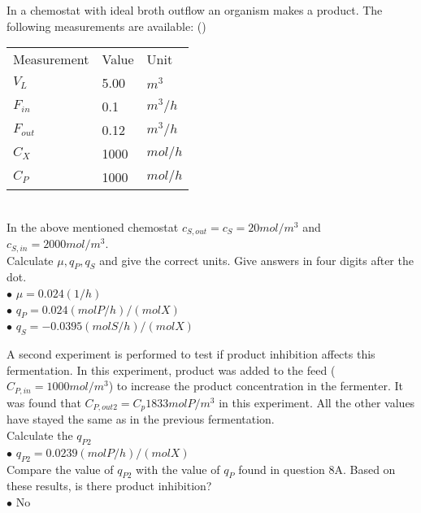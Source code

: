 \documentclass[]{beamer}
\begin{document}
\begin{frame}[shrink] {}
\addtocounter{questions}{1}
\color{blue}
In a chemostat with ideal broth outflow an organism makes a product. The following measurements are available: ()\\
\color{gray}
 \begin{tabular}[ ]{l l l}
Measurement & Value & Unit \\
$V_L$ & 5.00 & $m^3$ \\
$F_{in}$ & 0.1 & $m^{3}/h$ \\
$F_{out}$ & 0.12 & $m^{3}/h$ \\
$C_{X}$ & 1000 & $mol/h$ \\
$C_{P}$ & 1000 & $mol/h$ \\
 \end{tabular} \\
\color{black}
In the above mentioned chemostat $c_{S,out} = c_{S} =20mol/m^3$ and $c_{S,in} = 2000 mol/m^3$. \\[0.3em]
Calculate $\mu, q_P, q_S$ and give the correct units. Give answers in four digits after the dot. \\
\setlength{\parindent}{-0.4cm}
{\color{red}$\bullet$} $\mu=0.024(1/h)$ \\ 
{\color{red}$\bullet$} $q_P=0.024(molP/h)/(molX) $ \\ 
{\color{red}$\bullet$} $q_S=-0.0395 (molS/h)/(molX)$ \\
\end{frame}

\begin{frame}[shrink] {}
  A second experiment is performed to test if product inhibition affects this fermentation. In this experiment, product was added to the feed ($C_{P,in} = 1000 mol/m^3$) to increase the product concentration in the fermenter. It was found that $C_{P,out2} =C_p  1833 mol P/m^3$ in this experiment. All the other values have stayed the same as in the previous fermentation. \\[0.3em]
Calculate the $q_{P2}$ \\ 
{\color{red}$\bullet$} $q_{P2}=0.0239(molP/h)/(molX)$ \\[0.5em] 
Compare the value of $q_{P2}$ with the value of $q_{P}$ found in question 8A. Based on these results, is there product inhibition? \\
{\color{red}$\bullet$} No \\ 
\end{frame}

\end{document}
